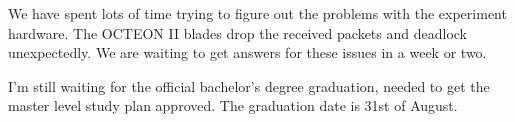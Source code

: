 We have spent lots of time trying to figure out the problems with the experiment hardware. The OCTEON II blades drop the received packets and deadlock unexpectedly. We are waiting to get answers for these issues in a week or two.

I'm still waiting for the official bachelor's degree graduation, needed to get the master level study plan approved. The graduation date is 31st of August.

